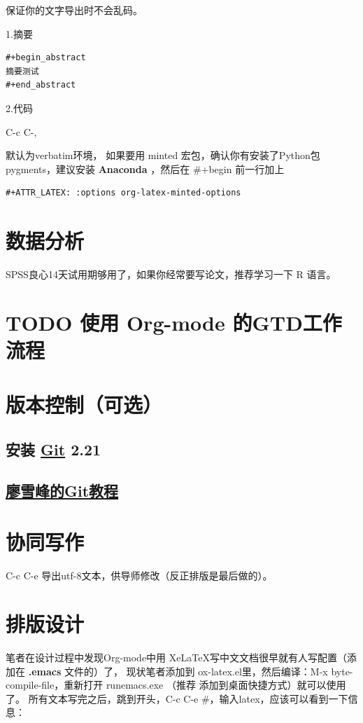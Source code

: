 \documentclass{ctexrep}
\begin{document}
保证你的文字导出时不会乱码。

1.摘要

\begin{verbatim}
#+begin_abstract
摘要测试
#+end_abstract
\end{verbatim}

2.代码

C-c C-,

默认为verbatim环境，
如果要用 minted 宏包，确认你有安装了Python包pygments，建议安装 \textbf{Anaconda} ，然后在 \#+begin
前一行加上

\begin{verbatim}
#+ATTR_LATEX: :options org-latex-minted-options
\end{verbatim}

\section{数据分析}
\label{sec:org40f6abb}
SPSS良心14天试用期够用了，如果你经常要写论文，推荐学习一下 R 语言。
\section{{\bfseries\sffamily TODO} 使用 Org-mode 的GTD工作流程}
\label{sec:org65c1eca}
\section{版本控制（可选）}
\label{sec:org567cdd4}
\subsection{安装 \href{https://git-scm.com/downloads}{Git} 2.21}
\label{sec:org8cd1a95}
\subsection{\href{https://www.liaoxuefeng.com/wiki/896043488029600}{廖雪峰的Git教程}}
\label{sec:org250cbff}
\section{协同写作}
\label{sec:org6b80c8e}
C-c C-e 导出utf-8文本，供导师修改（反正排版是最后做的）。
\section{排版设计}
\label{sec:orgf6e0dca}
笔者在设计过程中发现Org-mode中用 Xe\LaTeX 写中文文档很早就有人写配置（添加在 \textbf{.emacs} 文件的）了，
现状笔者添加到 ox-latex.el里，然后编译：M-x byte-compile-file，重新打开 runemacs.exe （推荐
添加到桌面快捷方式）就可以使用了。
所有文本写完之后，跳到开头，C-c C-e \#，输入latex，应该可以看到一下信息：
\end{document}
